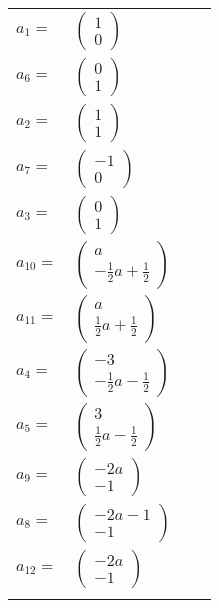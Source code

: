 \documentclass[1p]{elsarticle_modified}
\theoremstyle{definition}
\begin{document}
\begin{tabular}{m{7pt} m{180pt} m{7pt} m{180pt} }
\flushright $a_{1}=$&$\begin{pmatrix}1\\0\end{pmatrix}$ \\
\flushright $a_{6}=$&$\begin{pmatrix}0\\1\end{pmatrix}$ \\
\flushright $a_{2}=$&$\begin{pmatrix}1\\1\end{pmatrix}$ \\
\flushright $a_{7}=$&$\begin{pmatrix}-1\\0\end{pmatrix}$ \\
\flushright $a_{3}=$&$\begin{pmatrix}0\\1\end{pmatrix}$ \\
\flushright $a_{10}=$&$\begin{pmatrix}a\\-\frac{1}{2} a+\frac{1}{2}\end{pmatrix}$ \\
\flushright $a_{11}=$&$\begin{pmatrix}a\\\frac{1}{2} a+\frac{1}{2}\end{pmatrix}$ \\
\flushright $a_{4}=$&$\begin{pmatrix}-3\\-\frac{1}{2} a-\frac{1}{2}\end{pmatrix}$ \\
\flushright $a_{5}=$&$\begin{pmatrix}3\\\frac{1}{2} a-\frac{1}{2}\end{pmatrix}$ \\
\flushright $a_{9}=$&$\begin{pmatrix}-2 a\\-1\end{pmatrix}$ \\
\flushright $a_{8}=$&$\begin{pmatrix}-2 a-1\\-1\end{pmatrix}$ \\
\flushright $a_{12}=$&$\begin{pmatrix}-2 a\\-1\end{pmatrix}$\\&\end{tabular}
\end{document}
